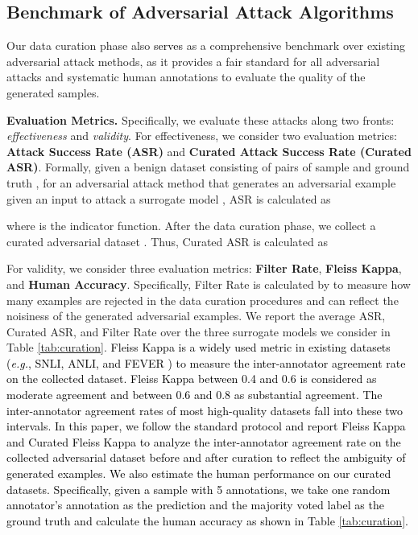\documentclass{article}
\newcommand{\m}[1]{{\textcolor{black}{{#1}}}}
\begin{document}
\subsection{Benchmark of Adversarial Attack Algorithms}
\label{sec:attack}
Our data curation phase also \m{serves} as a comprehensive benchmark over existing  adversarial attack methods, as it provides a fair standard for all adversarial attacks and systematic human annotations to evaluate the quality of the generated samples.

\textbf{Evaluation Metrics.} Specifically, we evaluate these attacks along two fronts: \textit{effectiveness} and \textit{validity}.
For effectiveness, we consider two evaluation metrics: \textbf{Attack Success Rate (ASR)} and \textbf{Curated Attack Success Rate (Curated ASR)}.  
Formally, given a benign dataset  consisting of  pairs of sample  and ground truth , for an adversarial attack method  that generates an adversarial example  given an input  to attack a surrogate model , ASR is calculated as

where  is the indicator function.
After the data curation phase, we collect a curated adversarial dataset . Thus, Curated ASR is calculated as 



For validity, we consider three evaluation metrics: \textbf{Filter Rate}, \textbf{Fleiss Kappa}, and \textbf{Human Accuracy}. Specifically, Filter Rate is calculated by  to measure how many examples are rejected in the data curation procedures and can reflect the noisiness of the generated adversarial examples. 
We report the average ASR, Curated ASR, and Filter Rate over the three surrogate models we consider in Table \ref{tab:curation}.
\m{Fleiss Kappa is a widely used metric in existing datasets (\emph{e.g.}, SNLI, ANLI, and FEVER \citep{snli, anli, fever}) to measure the inter-annotator agreement rate on the collected dataset. Fleiss Kappa between 0.4 and 0.6 is considered as moderate agreement and between 0.6 and 0.8 as substantial agreement. The inter-annotator agreement rates of most high-quality datasets fall into these two intervals. In this paper, we follow the standard protocol and report Fleiss Kappa and Curated Fleiss Kappa to analyze the inter-annotator agreement rate on the collected adversarial dataset before and after curation to reflect the ambiguity of  generated  examples. We also estimate the human performance on our curated datasets. Specifically, given a sample with 5 annotations, we take one random annotator's annotation as the prediction and the majority voted label as the ground truth and calculate the human accuracy as shown in Table \ref{tab:curation}.} 
\end{document}
